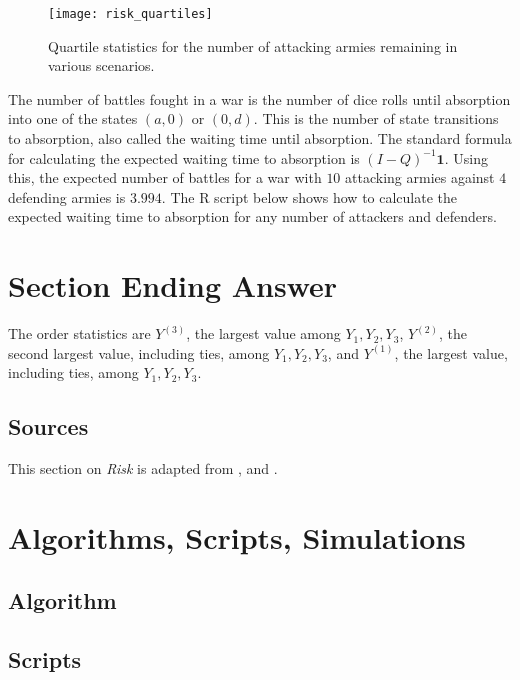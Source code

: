\documentclass[12pt]{article}
\begin{document}
\begin{figure}
    \centering
    \texttt{[image: risk\_quartiles]}
    \caption{Quartile statistics for the number of attacking armies
    remaining in various scenarios.}%
    \label{fig:riskgame:quartiles}
\end{figure}

The number of battles fought in a war is the number of dice rolls until
absorption into one of the states \( (a,0) \) or \( (0,d) \).  This is
the number of state transitions to absorption, also called the waiting
time until absorption.  The standard formula for calculating the
expected waiting time to absorption is \( (I-Q)^{-1} \mathbf{1} \).
Using this, the expected number of battles for a war with \( 10 \)
attacking armies against \( 4 \) defending armies is \( 3.994 \).  The R
script below shows how to calculate the expected waiting time to
absorption for any number of attackers and defenders.

\section*{Section Ending Answer}

The order statistics are \( Y^{(3)} \), the largest value among \( Y_1,
Y_2, Y_3 \), \( Y^{(2)} \), the second largest value, including ties,
among \( Y_1, Y_2, Y_3 \), and \( Y^{(1)} \), the largest value,
including ties, among \( Y_1, Y_2, Y_3 \).

\subsection*{Sources} This section on \emph{Risk} is adapted from
\cite{osborne03},
\cite{pierce15} and
\cite{tan97}.

\hr

\section*{Algorithms, Scripts, Simulations}

\subsection*{Algorithm}

\subsection*{Scripts}
\end{document}
